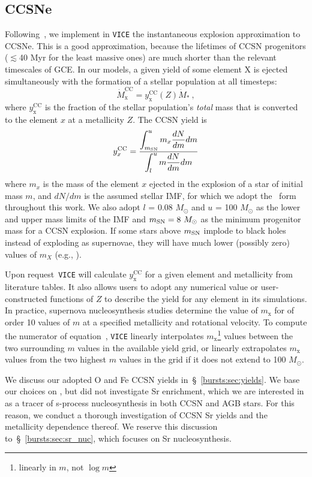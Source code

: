 \subsection{CCSNe} 
\label{bursts:sec:ccsne} 
Following~\citet{Weinberg2017b}, we implement in \texttt{VICE} the 
instantaneous explosion approximation to CCSNe. This is a good approximation, 
because the lifetimes of CCSN progenitors ($\lesssim$40 Myr for the least 
massive ones) are much shorter than the relevant timescales of 
GCE. In our models, a given yield of some element X is ejected 
simultaneously with the formation of a stellar population at all timesteps: 
\begin{equation} 
\label{bursts:eq:mdot_ccsne}
\dot{M}_\text{x}^\text{CC} = y_\text{x}^\text{CC}(Z)\dot{M}_* ~,
\end{equation} 
where $y_\text{x}^\text{CC}$ is the fraction of the stellar population's 
\textit{total} mass that is converted to the element $x$ at a metallicity 
$Z$.
The CCSN yield is
\begin{equation} 
\label{bursts:eq:frac_yield}
y_x^\text{CC} = \frac{\displaystyle{
	\int_{m_{\rm SN}}^u m_x \frac{dN}{dm}dm 
}}{\displaystyle{ 
	\int_l^u m \frac{dN}{dm}dm 
}}
\end{equation} 
where $m_x$ is the mass of the element $x$ ejected in the explosion of a star 
of initial mass $m$, and $dN/dm$ is the assumed stellar IMF, for which we adopt 
the~\citet{Kroupa2001} form throughout this work. We also adopt $l$ = 0.08 
$M_\odot$ and $u$ = 100 $M_\odot$ as the lower and upper mass limits of the 
IMF and $m_{\rm SN} = 8\ M_\odot$ 
as the minimum progenitor mass for a CCSN explosion. 
If some stars above $m_{\rm SN}$ implode to black holes instead of 
exploding as supernovae, they will have much lower (possibly zero)
values of $m_X$ (e.g., \citealt{Sukhbold2016}).
\par 
Upon request~\texttt{VICE} will calculate $y_\text{x}^\text{CC}$ for a given 
element and metallicity from literature tables.
It also allows users to adopt any numerical value or
user-constructed functions of $Z$ to describe the yield for any element in 
its simulations. 
In practice, supernova nucleosynthesis studies determine the value of 
$m_\text{x}$ for of order 10 values of $m$ at a specified metallicity and 
rotational velocity. To compute the numerator of equation~, 
\texttt{VICE} linearly interpolates $m_\text{x}$\footnote{
	linearly in $m$, not $\log m$
} values between the two surrounding $m$ values in the available yield 
grid, or linearly extrapolates $m_\text{x}$ values from the two highest $m$ 
values in the grid if it does not extend to 100 $M_\odot$. 
\par 
We discuss our adopted O and Fe CCSN yields 
in~\S~\ref{bursts:sec:yields}. 
We base our choices on \citet{Weinberg2017b}, but \citet{Weinberg2017b}
did not investigate Sr enrichment, which we 
are interested in as a tracer of s-process nucleosynthesis in both CCSN and 
AGB stars. For this reason, we conduct a thorough investigation of 
CCSN Sr yields and the metallicity dependence thereof. We reserve this 
discussion to~\S~\ref{bursts:sec:sr_nuc}, which focuses on Sr nucleosynthesis. 

